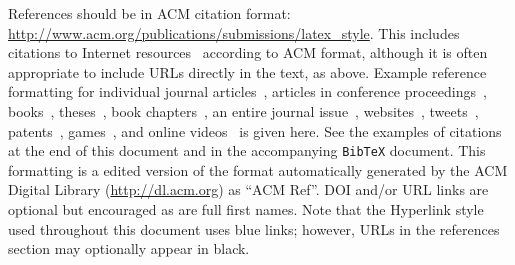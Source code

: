 \documentclass{sigchi-ext}
\begin{document}
References should be in ACM citation format:
\url{http://www.acm.org/publications/submissions/latex_style}.  This
includes citations to Internet
resources~\cite{CHINOSAUR:venue,cavender:writing,psy:gangnam}
according to ACM format, although it is often appropriate to include
URLs directly in the text, as above. Example reference formatting for
individual journal articles~\cite{ethics}, articles in conference
proceedings~\cite{Klemmer:2002:WSC:503376.503378},
books~\cite{Schwartz:1995:GBF}, theses~\cite{sutherland:sketchpad},
book chapters~\cite{winner:politics}, an entire journal
issue~\cite{kaye:puc},
websites~\cite{acm_categories,cavender:writing},
tweets~\cite{CHINOSAUR:venue}, patents~\cite{heilig:sensorama}, 
games~\cite{supermetroid:snes}, and
online videos~\cite{psy:gangnam} is given here.  See the examples of
citations at the end of this document and in the accompanying
\texttt{BibTeX} document. This formatting is a edited version of the
format automatically generated by the ACM Digital Library
(\url{http://dl.acm.org}) as ``ACM Ref''. DOI and/or URL links are
optional but encouraged as are full first names. Note that the
Hyperlink style used throughout this document uses blue links;
however, URLs in the references section may optionally appear in
black.

\balance{} 



\end{document}
